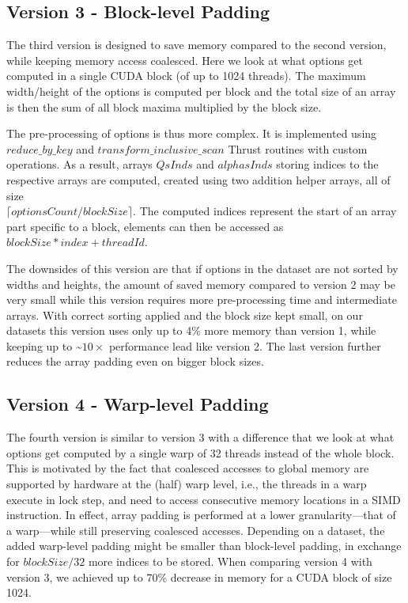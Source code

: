 \subsection*{Version 3 - Block-level Padding}
The third version is designed to save memory compared to the second version, while keeping memory access coalesced. Here we look at what options get computed in a single CUDA block (of up to 1024 threads). The maximum width/height of the options is computed per block and the total size of an array is then the sum of all block maxima multiplied by the block size.

The pre-processing of options is thus more complex. It is implemented using $\mathit{reduce\_by\_key}$ and $\mathit{transform\_inclusive\_scan}$ Thrust routines with custom operations. As a result, arrays $\mathit{QsInds}$ and $\mathit{alphasInds}$ storing indices to the respective arrays are computed, created using two addition helper arrays, all of size \\ $\lceil \mathit{optionsCount} / \mathit{blockSize} \rceil$. The computed indices represent the start of an array part specific to a block, elements can then be accessed as $\mathit{blockSize} * \mathit{index} + \mathit{threadId}$.

The downsides of this version are that if options in the dataset are not sorted by widths and heights, the amount of saved memory compared to version 2 may be very small while this version requires more pre-processing time and intermediate arrays. With correct sorting applied and the block size kept small, on our datasets this version uses only up to 4\% more memory than version 1, while keeping up to \textasciitilde$10\times$ performance lead like version 2. The last version further reduces the array padding even on bigger block sizes.

\subsection*{Version 4 - Warp-level Padding}
The fourth version is similar to version 3 with a difference that we look at what options get computed by a single warp of 32 threads instead of the whole block.  This is motivated by the fact that coalesced accesses to global memory are supported by hardware at the (half) warp level, i.e., the threads in a warp execute in lock step, and need to access consecutive memory locations in a SIMD instruction. In effect, array padding is performed at a lower granularity---that of a warp---while still preserving coalesced accesses. Depending on a dataset, the added warp-level padding might be smaller than block-level padding, in exchange for $\mathit{blockSize} / 32$ more indices to be stored. When comparing version 4 with version 3, we achieved up to 70\% decrease in memory for a CUDA block of size 1024. 

